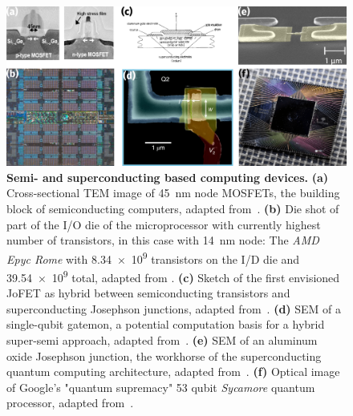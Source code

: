 \begin{figure}[t]
	\centering
	\includegraphics[width=\linewidth]{chapter-introduction/figs/intro_computing.svg.png}
	\caption{
		\textbf{Semi- and superconducting based computing devices.}
		\textbf{(a)} Cross-sectional TEM image of \SI{45}{\nano\meter} node MOSFETs, the building block of semiconducting computers, adapted from~\cite{thompsonLogicNanotechnologyFeaturing2004}.
		\textbf{(b)} Die shot of part of the I/O die of the microprocessor with currently highest number of transistors, in this case with \SI{14}{\nano\meter} node: The \textit{AMD Epyc Rome} with \num{8.34e9} transistors on the I/D die and \num{39.54e9} total, adapted from \cite{mujtabaAMDEPYCRome2019}.
		\textbf{(c)} Sketch of the first envisioned JoFET as hybrid between semiconducting transistors and superconducting Josephson junctions, adapted from~\cite{clarkFeasibilityHybridJosephson1980}.
		\textbf{(d)} SEM of a single-qubit gatemon, a potential computation basis for a hybrid super-semi approach, adapted from~\cite{casparisSuperconductingGatemonQubit2018}.
		\textbf{(e)} SEM of an aluminum oxide Josephson junction, the workhorse of the superconducting quantum computing architecture, adapted from~\cite{langfordExperimentallySimulatingDynamics2017}.
		\textbf{(f)} Optical image of Google's "quantum supremacy" 53 qubit \textit{Sycamore} quantum processor, adapted from~\cite{shanklandTakeLookGoogle2020}. 
	}
	\label{fig:introcomputing}
\end{figure}


